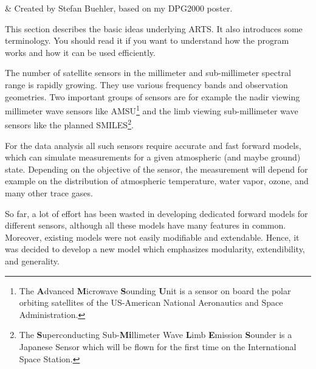%
%
 \label{sec:concept}

%
%
 & Created by Stefan Buehler, based on my DPG2000 poster.
\stophistory

%
%
%

%
%
This section describes the basic ideas underlying ARTS. It also
introduces some terminology. You should read it if you want
to understand how the program works and how it can be used
efficiently.


\label{sec:concept:intro}

The number of satellite sensors in the millimeter and sub-millimeter
spectral range is rapidly growing. They use various frequency
bands and observation geometries. Two important groups of
sensors are for example the nadir viewing millimeter wave
sensors like AMSU\footnote{The \textbf{A}dvanced
  \textbf{M}icrowave \textbf{S}ounding \textbf{U}nit is a
  sensor on board the polar orbiting satellites of the
  US-American National Aeronautics and Space Administration.}
and the limb viewing sub-millimeter wave sensors like the
planned SMILES\footnote{The \textbf{S}uperconducting
  Sub-\textbf{Mi}llimeter Wave \textbf{L}imb \textbf{E}mission
  \textbf{S}ounder is a Japanese Sensor which will be flown
  for the first time on the International Space Station.}.

For the data analysis all such sensors require accurate and
fast forward models, which can simulate measurements for a
given atmospheric (and maybe ground) state. Depending on the
objective of the sensor, the measurement will depend for
example on the distribution of atmospheric temperature, water
vapor, ozone, and many other trace gases.

So far, a lot of effort has been wasted in developing
dedicated forward models for different sensors, although all
these models have many features in common. Moreover, existing
models were not easily modifiable and extendable. Hence, it
was decided to develop a new model which emphasizes
modularity, extendibility, and generality.


